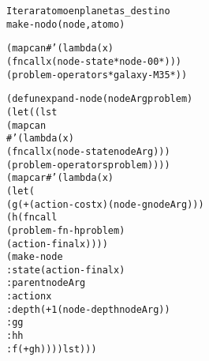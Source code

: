 \begin{aibox}{\pseudocode}
\begin{alltt}
Iterar atomo en planetas\_destino
    make-nodo (node,atomo)

\end{alltt}
\end{aibox}

\begin{aibox}{\code}
\begin{alltt}
(mapcan \#'(lambda(x)  
        (fncall x (node-state *node-00*))) 
        (problem-operators *galaxy-M35*))

(defun expand-node (nodeArg problem)
    (let ((lst
            (mapcan
                \#'(lambda(x)  
                    (fncall x (node-state nodeArg))) 
                (problem-operators problem))))
            (mapcar \#'(lambda(x) 
                (let (
                    (g (+ (action-cost x) (node-g nodeArg)))
                    (h (fncall 
                            (problem-fn-h problem)
                            (action-final x))))
                        (make-node
                            :state (action-final x)
                            :parent nodeArg
                            :action x
                            :depth (+ 1 (node-depth nodeArg))
                            :g g
                            :h h
                            :f (+ g h)))) lst)))






\end{alltt}
\end{aibox}

